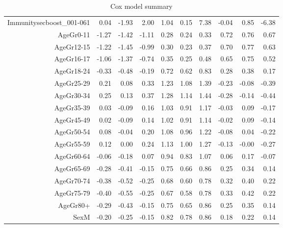 \begin{table}[ht]
\begin{tabular}{rrrrrrrrrr}
  Immunitysecboost\_001-061 & 0.04 & -1.93 & 2.00 & 1.04 & 0.15 & 7.38 & -0.04 & 0.85 & -6.38 \\ 
  AgeGr0-11 & -1.27 & -1.42 & -1.11 & 0.28 & 0.24 & 0.33 & 0.72 & 0.76 & 0.67 \\ 
  AgeGr12-15 & -1.22 & -1.45 & -0.99 & 0.30 & 0.23 & 0.37 & 0.70 & 0.77 & 0.63 \\ 
  AgeGr16-17 & -1.06 & -1.37 & -0.74 & 0.35 & 0.25 & 0.48 & 0.65 & 0.75 & 0.52 \\ 
  AgeGr18-24 & -0.33 & -0.48 & -0.19 & 0.72 & 0.62 & 0.83 & 0.28 & 0.38 & 0.17 \\ 
  AgeGr25-29 & 0.21 & 0.08 & 0.33 & 1.23 & 1.08 & 1.39 & -0.23 & -0.08 & -0.39 \\ 
  AgeGr30-34 & 0.25 & 0.13 & 0.37 & 1.28 & 1.14 & 1.44 & -0.28 & -0.14 & -0.44 \\ 
  AgeGr35-39 & 0.03 & -0.09 & 0.16 & 1.03 & 0.91 & 1.17 & -0.03 & 0.09 & -0.17 \\ 
  AgeGr45-49 & 0.02 & -0.09 & 0.14 & 1.02 & 0.91 & 1.14 & -0.02 & 0.09 & -0.14 \\ 
  AgeGr50-54 & 0.08 & -0.04 & 0.20 & 1.08 & 0.96 & 1.22 & -0.08 & 0.04 & -0.22 \\ 
  AgeGr55-59 & 0.12 & 0.00 & 0.24 & 1.13 & 1.00 & 1.27 & -0.13 & -0.00 & -0.27 \\ 
  AgeGr60-64 & -0.06 & -0.18 & 0.07 & 0.94 & 0.83 & 1.07 & 0.06 & 0.17 & -0.07 \\ 
  AgeGr65-69 & -0.28 & -0.41 & -0.15 & 0.75 & 0.66 & 0.86 & 0.25 & 0.34 & 0.14 \\ 
  AgeGr70-74 & -0.38 & -0.52 & -0.25 & 0.68 & 0.60 & 0.78 & 0.32 & 0.40 & 0.22 \\ 
  AgeGr75-79 & -0.40 & -0.55 & -0.25 & 0.67 & 0.58 & 0.78 & 0.33 & 0.42 & 0.22 \\ 
  AgeGr80+ & -0.29 & -0.43 & -0.15 & 0.75 & 0.65 & 0.86 & 0.25 & 0.35 & 0.14 \\ 
  SexM & -0.20 & -0.25 & -0.15 & 0.82 & 0.78 & 0.86 & 0.18 & 0.22 & 0.14 \\ 
   \hline
\end{tabular}
\caption{Cox model summary} 
\end{table}
